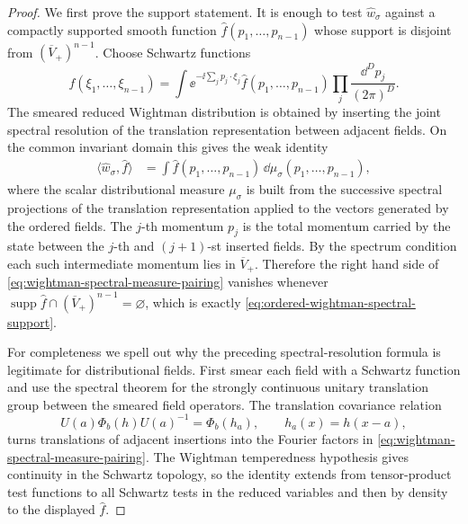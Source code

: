\begin{proof}
We first prove the support statement.  It is enough to test
\(\widehat w_\sigma\) against a compactly supported smooth function
\(\widehat f(p_1,\ldots,p_{n-1})\) whose support is disjoint from
\((\overline V_+)^{n-1}\).  Choose Schwartz functions
\[
  f(\xi_1,\ldots,\xi_{n-1})
  =
  \int
  \ee^{-\ii\sum_j p_j\cdot \xi_j}
  \widehat f(p_1,\ldots,p_{n-1})
  \prod_j\frac{\dd^Dp_j}{(2\pi)^D}.
\]
The smeared reduced Wightman distribution is obtained by inserting the
joint spectral resolution of the translation representation between adjacent
fields.  On the common invariant domain this gives the weak identity
\begin{equation}
\begin{aligned}
  \langle \widehat w_\sigma,\widehat f\rangle
  &=
  \int
  \widehat f(p_1,\ldots,p_{n-1})\,
  \dd\mu_\sigma(p_1,\ldots,p_{n-1}),
\end{aligned}
  \label{eq:wightman-spectral-measure-pairing}
\end{equation}
where the scalar distributional measure \(\mu_\sigma\) is built from the
successive spectral projections of the translation representation applied to
the vectors generated by the ordered fields.  The \(j\)-th momentum \(p_j\)
is the total momentum carried by the state between the \(j\)-th and
\((j+1)\)-st inserted fields.  By the spectrum condition each such
intermediate momentum lies in \(\overline V_+\).  Therefore the right hand
side of \eqref{eq:wightman-spectral-measure-pairing} vanishes whenever
\(\operatorname{supp}\widehat f\cap(\overline V_+)^{n-1}=\varnothing\),
which is exactly
\eqref{eq:ordered-wightman-spectral-support}.

For completeness we spell out why the preceding spectral-resolution formula
is legitimate for distributional fields.  First smear each field with a
Schwartz function and use the spectral theorem for the strongly continuous
unitary translation group between the smeared field operators.  The
translation covariance relation
\[
  U(a)\Phi_b(h)U(a)^{-1}=\Phi_b(h_a),
  \qquad h_a(x)=h(x-a),
\]
turns translations of adjacent insertions into the Fourier factors in
\eqref{eq:wightman-spectral-measure-pairing}.  The Wightman temperedness
hypothesis gives continuity in the Schwartz topology, so the identity extends
from tensor-product test functions to all Schwartz tests in the reduced
variables and then by density to the displayed \(\widehat f\).


\end{proof}
